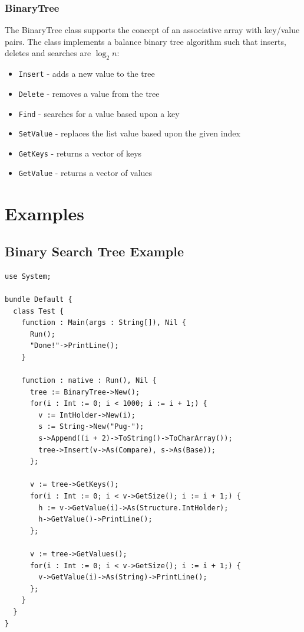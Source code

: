 \documentclass[12pt]{article}
\begin{document}
\subsubsection{BinaryTree}
The BinaryTree class supports the concept of an associative array with key/value pairs.  The class implements a balance binary tree algorithm such that inserts, deletes and searches are $\log_2 n$:
\begin{itemize}
    \item \texttt{Insert} - adds a new value to the tree
    \item \texttt{Delete} - removes a value from the tree
    \item \texttt{Find} - searches for a value based upon a key
    \item \texttt{SetValue} - replaces the list value based upon the given index
    \item \texttt{GetKeys} - returns a vector of keys
    \item \texttt{GetValue} - returns a vector of values
\end{itemize}

\section{Examples}

\subsection{Binary Search Tree Example}
\begin{verbatim}
use System;

bundle Default {
  class Test {
    function : Main(args : String[]), Nil {
      Run();
      "Done!"->PrintLine();
    }

    function : native : Run(), Nil {
      tree := BinaryTree->New();
      for(i : Int := 0; i < 1000; i := i + 1;) {
        v := IntHolder->New(i);
        s := String->New("Pug-");
        s->Append((i + 2)->ToString()->ToCharArray());
        tree->Insert(v->As(Compare), s->As(Base));
      };

      v := tree->GetKeys();
      for(i : Int := 0; i < v->GetSize(); i := i + 1;) {
        h := v->GetValue(i)->As(Structure.IntHolder);
        h->GetValue()->PrintLine();
      };

      v := tree->GetValues();
      for(i : Int := 0; i < v->GetSize(); i := i + 1;) {
        v->GetValue(i)->As(String)->PrintLine();
      };
    }
  }
}
\end{verbatim}
\end{document}
